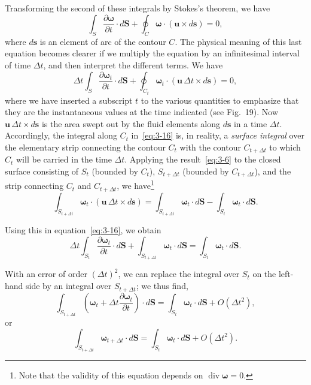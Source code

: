 Transforming the second of these integrals by Stokes's theorem, we have
\begin{equation}\label{eq:3-15}
\int_S \frac{\partial\boldsymbol{\omega}}{\partial t}\cdot d\mathbf{S} + \oint_C \boldsymbol{\omega}\cdot(\mathbf{u}\times d\mathbf{s}) = 0,
\end{equation}
where $d\mathbf{s}$ is an element of arc of the contour $C$. The physical meaning of this last equation becomes clearer if we multiply the equation by an infinitesimal interval of time $\Delta t$, and then interpret the different terms. We have
\begin{equation}\label{eq:3-16}
\Delta t \int_S \frac{\partial\boldsymbol{\omega}_t}{\partial t}\cdot d\mathbf{S} + \oint_{C_t} \boldsymbol{\omega}_t\cdot(\mathbf{u}\,\Delta t \times d\mathbf{s}) = 0,
\end{equation}
where we have inserted a subscript $t$ to the various quantities to emphasize that they are the instantaneous values at the time indicated (see Fig.~19). Now $\mathbf{u}\,\Delta t \times d\mathbf{s}$ is the area swept out by the fluid elements along $d\mathbf{s}$ in a time $\Delta t$. Accordingly, the integral along $C_t$ in~\eqref{eq:3-16} is, in reality, a \emph{surface integral} over the elementary strip connecting the contour $C_t$ with the contour $C_{t+\Delta t}$ to which $C_t$ will be carried in the time $\Delta t$. Applying the result~\eqref{eq:3-6} to the closed surface consisting of $S_t$ (bounded by $C_t$), $S_{t+\Delta t}$ (bounded by $C_{t+\Delta t}$), and the strip connecting $C_t$ and $C_{t+\Delta t}$, we have\footnote{Note that the validity of this equation depends on $\operatorname{div}\boldsymbol{\omega} = 0$.}
\begin{equation}\label{eq:3-17}
\int_{S_{t+\Delta t}} \boldsymbol{\omega}_t\cdot(\mathbf{u}\,\Delta t \times d\mathbf{s}) = \int_{S_{t+\Delta t}} \boldsymbol{\omega}_t\cdot d\mathbf{S} - \int_{S_t} \boldsymbol{\omega}_t\cdot d\mathbf{S}.
\end{equation}

Using this in equation~\eqref{eq:3-16}, we obtain
\begin{equation}\label{eq:3-18}
\Delta t \int_{S_t} \frac{\partial\boldsymbol{\omega}_t}{\partial t}\cdot d\mathbf{S} + \int_{S_{t+\Delta t}} \boldsymbol{\omega}_t\cdot d\mathbf{S} = \int_{S_t} \boldsymbol{\omega}_t\cdot d\mathbf{S}.
\end{equation}

With an error of order $(\Delta t)^2$, we can replace the integral over $S_t$ on the left-hand side by an integral over $S_{t+\Delta t}$; we thus find,
\begin{equation}\label{eq:3-19}
\int_{S_{t+\Delta t}} \!\left(\boldsymbol{\omega}_t + \Delta t\frac{\partial\boldsymbol{\omega}_t}{\partial t}\right)\!\cdot d\mathbf{S} = \int_{S_t} \boldsymbol{\omega}_t\cdot d\mathbf{S} + O(\Delta t^2),
\end{equation}
or
\begin{equation}\label{eq:3-20}
\int_{S_{t+\Delta t}} \boldsymbol{\omega}_{t+\Delta t}\cdot d\mathbf{S} = \int_{S_t} \boldsymbol{\omega}_t\cdot d\mathbf{S} + O(\Delta t^2).
\end{equation}

